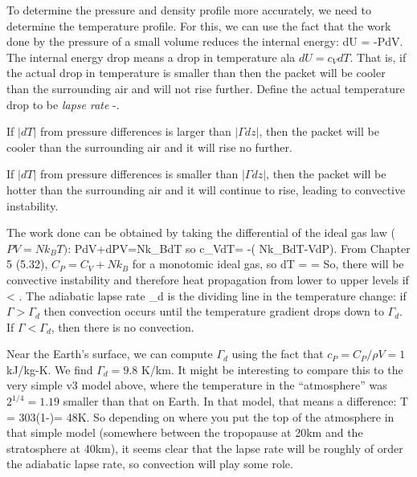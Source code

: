 \documentclass[11pt]{book}
\begin{document}
To determine the pressure and density profile more accurately, we need to determine the temperature profile. For this, we can use the fact that the work done by the pressure of a small volume reduces the internal energy:
\be
dU = -PdV.
\ee
The internal energy drop means a drop in temperature ala $dU=c_VdT$. That is, if the actual drop in temperature is smaller than then the packet will be cooler than the surrounding air and will not rise further. 
Define the actual temperature drop to be {\it lapse rate}
\be
\Gamma \equiv -.
\ee
\bee
\item If $|dT|$ from pressure differences is larger than $|\Gamma dz|$, then the packet will be cooler than the surrounding air and it will rise no further. 
\item If $|dT|$ from pressure differences is smaller than $|\Gamma dz|$, then the packet will be hotter than the surrounding air and it will continue to rise, leading to convective instability. 
\eee

The work done can be obtained by taking the differential of the ideal gas law ($PV=Nk_BT)$:
\be
PdV+dPV=Nk_BdT\ee
so
\be
c_VdT= -\left( Nk_BdT-VdP\right).
\ee
From Chapter 5 (5.32), $C_P=C_V+Nk_B$ for a monotomic ideal gas, so
\be
dT =  = 
\ee
So, there will be convective instability and therefore heat propagation from lower to upper levels if
\be
{} < \Gamma.
\ee
The adiabatic lapse rate \be
\Gamma_d \equiv {}
\ee
is the dividing line in the temperature change: if $\Gamma>\Gamma_d$ then convection occurs until the temperature gradient drops down to $\Gamma_d$. If $\Gamma< \Gamma_d$, then there is no convection.

Near the Earth's surface, we can compute $\Gamma_d$ using the fact that $c_P=C_P/\rho V=1$ kJ/kg-K. We find $\Gamma_d=9.8$ K/km. It might be interesting to compare this to the very simple v3 model above, where the temperature in the ``atmosphere'' was $2^{1/4}=1.19$ smaller than that on Earth. In that model, that means a difference: 
\be
\Delta T = 303\left(1-\right)= 48K.\ee
So depending on where you put the top of the atmosphere in that simple model (somewhere between the tropopause at 20km and the stratosphere at 40km), it seems clear that the lapse rate will be roughly of order the adiabatic lapse rate, so convection will play some role.
\end{document}
